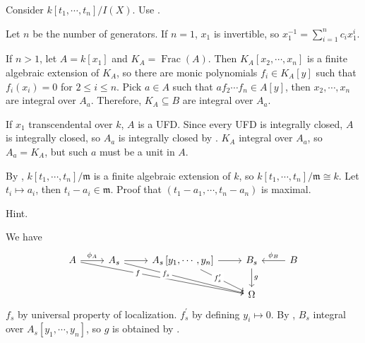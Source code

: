 \begin{exercise}\label{ex5.15}
	
\end{exercise}

\begin{exercise}\label{ex5.16}
	
\end{exercise}

\begin{exercise}\label{ex5.17}
	Consider $k\left[t_1,\cdots,t_n\right]/I(X)$. Use .
\end{exercise}

\begin{exercise}[\textcolor{red}{Zariski's lemma}]\label{ex5.18}
	Let $n$ be the number of generators. If $n=1$, $x_1$ is invertible, so $x_1^{-1}=\sum_{i=1}^nc_ix_1^i$.
	
	If $n>1$, let $A=k\left[x_1\right]$ and $K_A=\operatorname{Frac}(A)$. Then $K_A[x_2,\cdots,x_n]$ is a finite algebraic extension of $K_A$, so there are monic polynomials $f_i\in K_A[y]$ such that $f_i\left(x_i\right)=0$ for $2\leqslant i\leqslant n$. Pick $a\in A$ such that $af_2\cdots f_n\in A[y]$, then $x_2,\cdots,x_n$ are integral over $A_a$. Therefore, $K_A\subseteq B$ are integral over $A_a$.
	
	If $x_1$ transcendental over $k$, $A$ is a UFD. Since every UFD is integrally closed, $A$ is integrally closed, so $A_a$ is integrally closed by . $K_A$ integral over $A_a$, so $A_a=K_A$, but such $a$ must be a unit in $A$.
\end{exercise}

\begin{exercise}\label{ex5.19}
	By , $k\left[t_1,\cdots,t_n\right]/\mathfrak{m}$ is a finite algebraic extension of $k$, so $k\left[t_1,\cdots,t_n\right]/\mathfrak{m}\cong k$. Let $t_i\mapsto a_i$, then $t_i-a_i\in\mathfrak{m}$. Proof that $\left(t_1-a_1,\cdots,t_n-a_n\right)$ is maximal.
\end{exercise}

\begin{exercise}\label{ex5.20}
	Hint.
\end{exercise}

\begin{exercise}\label{ex5.21}
	We have
	\begin{equation*}
		\begin{tikzcd}
			A\arrow[r,"\phi_A"]\arrow[drrr,"f"{description,pos=0.35}]&A_s\arrow[r]\arrow[drr,"f_s"{description,pos=0.35}]&A_s\left[y_1,\cdots,y_n\right]\arrow[r]\arrow[dr,"f_s^\prime"{description,pos=0.4}]
			&B_s\arrow[d,"g"]&B\arrow[l,"\phi_B"']\\
			&&&\Omega&
		\end{tikzcd}
	\end{equation*}
	$f_s$ by universal property of localization. $f_s^\prime$ by defining $y_i\mapsto0$. By , $B_s$ integral over $A_s\left[y_1,\cdots,y_n\right]$, so $g$ is obtained by .
\end{exercise}

